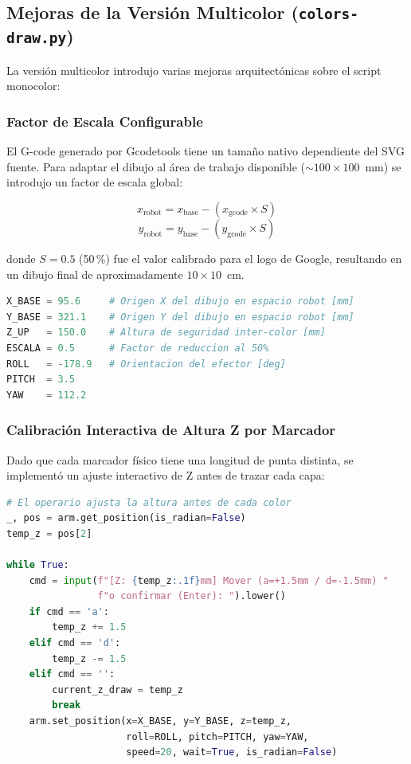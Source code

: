 \documentclass[journal,compsoc]{IEEEtran}
\begin{document}
\subsection{Mejoras de la Versión Multicolor (\texttt{colors-draw.py})}

La versión multicolor introdujo varias mejoras arquitectónicas sobre el script monocolor:

\subsubsection{Factor de Escala Configurable}
El G-code generado por Gcodetools tiene un tamaño nativo dependiente del SVG fuente. Para adaptar el dibujo al área de trabajo disponible ($\sim 100 \times 100$~mm) se introdujo un factor de escala global:

\begin{equation}
    x_{\text{robot}} = x_{\text{base}} - (x_{\text{gcode}} \times S)
\end{equation}
\begin{equation}
    y_{\text{robot}} = y_{\text{base}} - (y_{\text{gcode}} \times S)
\end{equation}

donde $S = 0.5$ (50\,\%) fue el valor calibrado para el logo de Google, resultando en un dibujo final de aproximadamente $10 \times 10$~cm.

\begin{lstlisting}[language=Python, caption=Parámetros de posición y escala del caso multicolor.]
X_BASE = 95.6     # Origen X del dibujo en espacio robot [mm]
Y_BASE = 321.1    # Origen Y del dibujo en espacio robot [mm]
Z_UP   = 150.0    # Altura de seguridad inter-color [mm]
ESCALA = 0.5      # Factor de reduccion al 50%
ROLL   = -178.9   # Orientacion del efector [deg]
PITCH  = 3.5
YAW    = 112.2
\end{lstlisting}

\subsubsection{Calibración Interactiva de Altura Z por Marcador}

Dado que cada marcador físico tiene una longitud de punta distinta, se implementó un ajuste interactivo de Z antes de trazar cada capa:

\begin{lstlisting}[language=Python, caption=Calibración interactiva de la altura Z por marcador.]
# El operario ajusta la altura antes de cada color
_, pos = arm.get_position(is_radian=False)
temp_z = pos[2]

while True:
    cmd = input(f"[Z: {temp_z:.1f}mm] Mover (a=+1.5mm / d=-1.5mm) "
                f"o confirmar (Enter): ").lower()
    if cmd == 'a':
        temp_z += 1.5
    elif cmd == 'd':
        temp_z -= 1.5
    elif cmd == '':
        current_z_draw = temp_z
        break
    arm.set_position(x=X_BASE, y=Y_BASE, z=temp_z,
                     roll=ROLL, pitch=PITCH, yaw=YAW,
                     speed=20, wait=True, is_radian=False)
\end{lstlisting}
\end{document}
